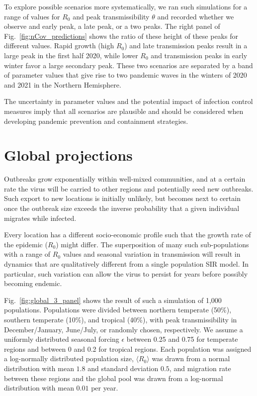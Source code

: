 \documentclass[rmp, reprint, superscriptaddress, floatfix,amsmath]{revtex4-1}
\begin{document}
To explore possible scenarios more systematically, we ran such simulations for a range of values for $R_0$ and peak transmissibility $\theta$ and recorded whether we observe and early peak, a late peak, or a two peaks. 
The right panel of Fig.~\ref{fig:nCov_predictions} shows the ratio of these height of these peaks for different values.
Rapid growth (high $R_0$) and late transmission peaks result in a large peak in the first half 2020, while lower $R_0$ and transmission peaks in early winter favor a large secondary peak. 
These two scenarios are separated by a band of parameter values that give rise to two pandemic waves in the winters of 2020 and 2021 in the Northern Hemisphere.

The uncertainty in parameter values and the potential impact of infection control measures imply that all scenarios are plausible and should be considered when developing pandemic prevention and containment strategies.


\section{Global projections}
Outbreaks grow exponentially within well-mixed communities, and at a certain rate the virus will be carried to other regions and potentially seed new outbreaks. 
Such export to new locations is initially unlikely, but becomes next to certain once the outbreak size exceeds the inverse probability that a given individual migrates while infected.

Every location has a different socio-economic profile such that the growth rate of the epidemic ($R_0$) might differ. 
The superposition of many such sub-populations with a range of $R_0$ values and seasonal variation in transmission will result in dynamics that are qualitatively different from a single population SIR model. 
In particular, such variation can allow the virus to persist for years before possibly becoming endemic. 

Fig.~\ref{fig:global_3_panel} shows the result of such a simulation of 1,000 populations.
Populations were divided between northern temperate (50\%), southern temperate (10\%), and tropical (40\%), with peak transmissibility in December/January, June/July, or randomly chosen, respectively. 
We assume a uniformly distributed seasonal forcing $\epsilon$ between 0.25 and 0.75 for temperate regions and between 0 and 0.2 for tropical regions. 
Each population was assigned a log-normally distributed population size, $\langle R_0\rangle$ was drawn from a normal distribution with mean $1.8$ and standard deviation $0.5$, and migration rate between these regions and the global pool was drawn from a log-normal distribution with mean $0.01$ per year. 
\end{document}
